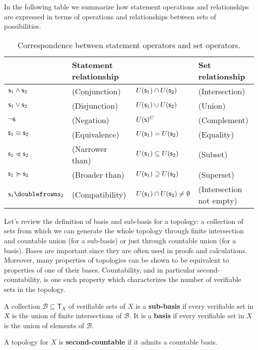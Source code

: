 \documentclass[11pt,letterpaper,fleqn]{memoir} %
\begin{document}
In the following table we summarize how statement operations and relationships are expressed in terms of operations and relationships between sets of possibilities.

\begin{table}[h]
	\centering
	\begin{tabular}{p{} p{} p{} p{}}
		& Statement relationship & & Set relationship  \\ 
		\hline 
		$\mathsf{s}_1 \wedge \mathsf{s}_2$ & (Conjunction) & $U(\mathsf{s}_1) \cap U(\mathsf{s}_2)$ & (Intersection) \\ 
		$\mathsf{s}_1 \vee \mathsf{s}_2$ & (Disjunction) & $U(\mathsf{s}_1) \cup U(\mathsf{s}_2)$ & (Union) \\ 
		$\neg \mathsf{s}$ & (Negation) & $U(\mathsf{s})^C$ & (Complement) \\ 
		$\mathsf{s}_1 \equiv \mathsf{s}_2$ & (Equivalence) & $U(\mathsf{s}_1) = U(\mathsf{s}_2)$ & (Equality) \\ 
		$\mathsf{s}_1 \preccurlyeq \mathsf{s}_2$ & (Narrower than) & $U(\mathsf{s}_1) \subseteq U(\mathsf{s}_2)$ & (Subset) \\ 
		$\mathsf{s}_1 \succcurlyeq \mathsf{s}_2$ & (Broader than) & $U(\mathsf{s}_1) \supseteq U(\mathsf{s}_2)$ & (Superset) \\ 
		$\stmt_1 \comp \stmt_2$ & (Compatibility) & $U(\mathsf{s}_1) \cap U(\mathsf{s}_2) \neq \emptyset$ & (Intersection not empty)
	\end{tabular} 
	\caption{Correspondence between statement operators and set operators.}
\end{table}

Let's review the definition of basis and sub-basis for a topology: a collection of sets from which we can generate the whole topology through finite intersection and countable union (for a sub-basis) or just through countable union (for a basis). Bases are important since they are often used in proofs and calculations. Moreover, many properties of topologies can be shown to be equivalent to properties of one of their bases. Countability, and in particular second-countability, is one such property which characterizes the number of verifiable sets in the topology.

\begin{mathSection}
\begin{defn}
	A collection $\mathcal{B} \subseteq \mathsf{T}_X$ of verifiable sets of $X$ is a \textbf{sub-basis} if every verifiable set in $X$ is the union of finite intersections of $\mathcal{B}$. It is a \textbf{basis} if every verifiable set in $X$ is the union of elements of $\mathcal{B}$.
\end{defn}
\begin{defn}
	A topology for $X$ is \textbf{second-countable} if it admits a countable basis.
\end{defn}
\end{mathSection}
\end{document}
